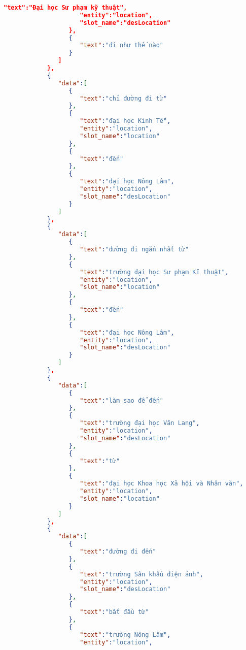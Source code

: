 \begin{lstlisting}[language=json,firstnumber=1]
                     "text":"Đại học Sư phạm kỹ thuật",
                     "entity":"location",
                     "slot_name":"desLocation"
                  },
                  {
                     "text":"đi như thế nào"
                  }
               ]
            },
            {
               "data":[
                  {
                     "text":"chỉ đường đi từ"
                  },
                  {
                     "text":"đại học Kinh Tế",
                     "entity":"location",
                     "slot_name":"location"
                  },
                  {
                     "text":"đến"
                  },
                  {
                     "text":"đại học Nông Lâm",
                     "entity":"location",
                     "slot_name":"desLocation"
                  }
               ]
            },
            {
               "data":[
                  {
                     "text":"đường đi ngắn nhất từ"
                  },
                  {
                     "text":"trường đại học Sư phạm Kĩ thuật",
                     "entity":"location",
                     "slot_name":"location"
                  },
                  {
                     "text":"đến"
                  },
                  {
                     "text":"đại học Nông Lâm",
                     "entity":"location",
                     "slot_name":"desLocation"
                  }
               ]
            },
            {
               "data":[
                  {
                     "text":"làm sao để đến"
                  },
                  {
                     "text":"trường đại học Văn Lang",
                     "entity":"location",
                     "slot_name":"desLocation"
                  },
                  {
                     "text":"từ"
                  },
                  {
                     "text":"đại học Khoa học Xã hội và Nhân văn",
                     "entity":"location",
                     "slot_name":"location"
                  }
               ]
            },
            {
               "data":[
                  {
                     "text":"đường đi đến"
                  },
                  {
                     "text":"trường Sân khấu điện ảnh",
                     "entity":"location",
                     "slot_name":"desLocation"
                  },
                  {
                     "text":"bắt đầu từ"
                  },
                  {
                     "text":"trường Nông Lâm",
                     "entity":"location",

\end{lstlisting}
